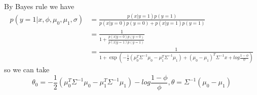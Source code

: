 \begin{answer}
By Bayes rule we have
\begin{align*}
p(y=1|x,\phi,\mu_0,\mu_1,\sigma) &= \frac{p(x|y=1)p(y=1)}{p(x|y=0)p(y=0)+p(x|y=1)p(y=1)}\\
&=\frac{1}{1+\frac{p(x|y=0)p(y=0)}{p(x|y=1)p(y=1)}}\\
&=\frac{1}{1+\exp\left(-\frac{1}{2}(\mu_{0}^T \Sigma^{-1} \mu_{0}-\mu_{1}^T \Sigma^{-1} \mu_{1})+(\mu_{0}-\mu_1)^T\Sigma^{-1}x+log\frac{1-\phi}{\phi}\right)}
\end{align*}
so we can take
$$
\theta_0 = -\frac{1}{2}(\mu_{0}^T \Sigma^{-1} \mu_{0}-\mu_{1}^T \Sigma^{-1} \mu_{1})-log\frac{1-\phi}{\phi},\theta = \Sigma^{-1}(\mu_{0}-\mu_1)
$$
\end{answer}
